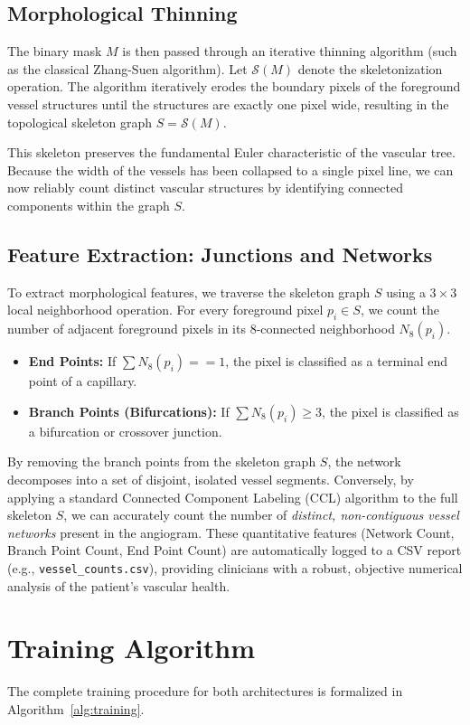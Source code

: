\subsection{Morphological Thinning}
The binary mask $M$ is then passed through an iterative thinning algorithm (such as the classical Zhang-Suen algorithm). Let $\mathcal{S}(M)$ denote the skeletonization operation. The algorithm iteratively erodes the boundary pixels of the foreground vessel structures until the structures are exactly one pixel wide, resulting in the topological skeleton graph $S = \mathcal{S}(M)$. 

This skeleton preserves the fundamental Euler characteristic of the vascular tree. Because the width of the vessels has been collapsed to a single pixel line, we can now reliably count distinct vascular structures by identifying connected components within the graph $S$. 

\subsection{Feature Extraction: Junctions and Networks}
To extract morphological features, we traverse the skeleton graph $S$ using a $3 \times 3$ local neighborhood operation. For every foreground pixel $p_i \in S$, we count the number of adjacent foreground pixels in its 8-connected neighborhood $N_8(p_i)$.
\begin{itemize}
    \item \textbf{End Points:} If $\sum N_8(p_i) == 1$, the pixel is classified as a terminal end point of a capillary.
    \item \textbf{Branch Points (Bifurcations):} If $\sum N_8(p_i) \ge 3$, the pixel is classified as a bifurcation or crossover junction.
\end{itemize}

By removing the branch points from the skeleton graph $S$, the network decomposes into a set of disjoint, isolated vessel segments. Conversely, by applying a standard Connected Component Labeling (CCL) algorithm to the full skeleton $S$, we can accurately count the number of \textit{distinct, non-contiguous vessel networks} present in the angiogram. These quantitative features (Network Count, Branch Point Count, End Point Count) are automatically logged to a CSV report (e.g., \texttt{vessel\_counts.csv}), providing clinicians with a robust, objective numerical analysis of the patient's vascular health.

\section{Training Algorithm}
The complete training procedure for both architectures is formalized in Algorithm~\ref{alg:training}.

